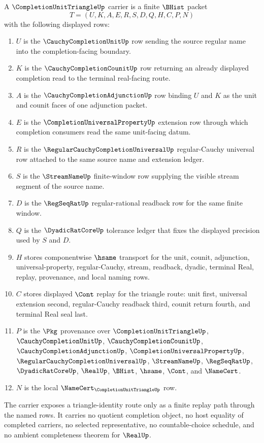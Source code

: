 \begin{definition}\label{def:completion-unit-triangle-carrier}
A $\CompletionUnitTriangleUp$ carrier is a finite $\BHist$ packet
$$
T=(U,K,A,E,R,S,D,Q,H,C,P,N)
$$
with the following displayed rows:
\begin{enumerate}
\item $U$ is the $\CauchyCompletionUnitUp$ row sending the source regular name into the completion-facing boundary.
\item $K$ is the $\CauchyCompletionCounitUp$ row returning an already displayed completion read to the terminal real-facing route.
\item $A$ is the $\CauchyCompletionAdjunctionUp$ row binding $U$ and $K$ as the unit and counit faces of one adjunction packet.
\item $E$ is the $\CompletionUniversalPropertyUp$ extension row through which completion consumers read the same unit-facing datum.
\item $R$ is the $\RegularCauchyCompletionUniversalUp$ regular-Cauchy universal row attached to the same source name and extension ledger.
\item $S$ is the $\StreamNameUp$ finite-window row supplying the visible stream segment of the source name.
\item $D$ is the $\RegSeqRatUp$ regular-rational readback row for the same finite window.
\item $Q$ is the $\DyadicRatCoreUp$ tolerance ledger that fixes the displayed precision used by $S$ and $D$.
\item $H$ stores componentwise $\hsame$ transport for the unit, counit, adjunction, universal-property, regular-Cauchy, stream, readback, dyadic, terminal Real, replay, provenance, and local naming rows.
\item $C$ stores displayed $\Cont$ replay for the triangle route: unit first, universal extension second, regular-Cauchy readback third, counit return fourth, and terminal Real seal last.
\item $P$ is the $\Pkg$ provenance over $\CompletionUnitTriangleUp$, $\CauchyCompletionUnitUp$, $\CauchyCompletionCounitUp$, $\CauchyCompletionAdjunctionUp$, $\CompletionUniversalPropertyUp$, $\RegularCauchyCompletionUniversalUp$, $\StreamNameUp$, $\RegSeqRatUp$, $\DyadicRatCoreUp$, $\RealUp$, $\BHist$, $\hsame$, $\Cont$, and $\NameCert$.
\item $N$ is the local $\NameCert_{\CompletionUnitTriangleUp}$ row.
\end{enumerate}
The carrier exposes a triangle-identity route only as a finite replay path through the named rows. It carries no quotient completion object, no host equality of completed carriers, no selected representative, no countable-choice schedule, and no ambient completeness theorem for $\RealUp$.
\end{definition}

